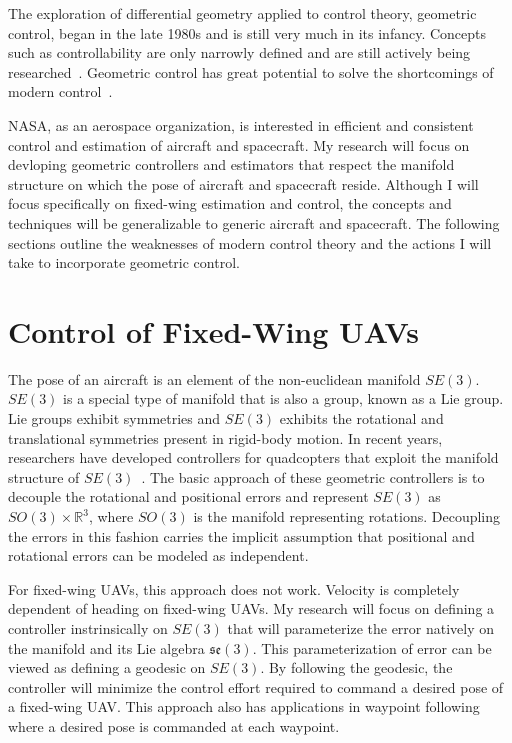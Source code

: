 \documentclass[letterpaper, 10 pt, conference]{ieeeconf}  %
\begin{document}
The exploration of differential geometry applied to control theory, geometric control, began in the late 1980s and is still very much in its infancy. Concepts such as controllability are only narrowly defined and are still actively being researched~\cite{Bullo2004Geometric}. Geometric control has great potential to solve the shortcomings of modern control~\cite{Lewis2018Bountiful}.

NASA, as an aerospace organization, is interested in efficient and consistent control and estimation of aircraft and spacecraft. My research will focus on devloping geometric controllers and estimators that respect the manifold structure on which the pose of aircraft and spacecraft reside. Although I will focus specifically on fixed-wing estimation and control, the concepts and techniques will be generalizable to generic aircraft and spacecraft. The following sections outline the weaknesses of modern control theory and the actions I will take to incorporate geometric control.

\section{Control of Fixed-Wing UAVs}
The pose of an aircraft is an element of the non-euclidean manifold $SE(3)$. $SE(3)$ is a special type of manifold that is also a group, known as a Lie group. Lie groups exhibit symmetries and $SE(3)$ exhibits the rotational and translational symmetries present in rigid-body motion. In recent years, researchers have developed controllers for quadcopters that exploit the manifold structure of $SE(3)$~\cite{Lee2010Control, Lee2010Geometric}. The basic approach of these geometric controllers is to decouple the rotational and positional errors and represent $SE(3)$ as $SO(3) \times \mathds{R}^3$, where $SO(3)$ is the manifold representing rotations. Decoupling the errors in this fashion carries the implicit assumption that positional and rotational errors can be modeled as independent.

For fixed-wing UAVs, this approach does not work. Velocity is completely dependent of heading on fixed-wing UAVs. My research will focus on defining a controller instrinsically on $SE(3)$ that will parameterize the error natively on the manifold and its Lie algebra $\mathfrak{se}(3)$. This parameterization of error can be viewed as defining a geodesic on $SE(3)$. By following the geodesic, the controller will minimize the control effort required to command a desired pose of a fixed-wing UAV. This approach also has applications in waypoint following where a desired pose is commanded at each waypoint.
\end{document}
